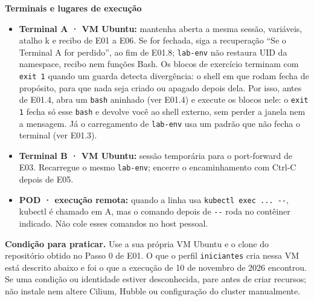 \documentclass[12pt,openany,oneside,a4paper,chapter=TITLE,english,brazil]{abntex2}
\providecommand{\tightlist}{\setlength{\itemsep}{0pt}\setlength{\parskip}{0pt}}
\begin{document}
\textbf{Terminais e lugares de execução}

\begin{itemize}
\tightlist
\item
  \textbf{Terminal A · VM Ubuntu:} mantenha aberta a mesma sessão, variáveis, atalho k e recibo de E01 a E06. Se for fechada, siga a recuperação ``Se o Terminal A for perdido'', ao fim de E01.8; \texttt{lab-{}\allowbreak{}env} não restaura UID da namespace, recibo nem funções Bash. Os blocos de exercício terminam com \texttt{exit 1} quando um guarda detecta divergência: o shell em que rodam fecha de propósito, para que nada seja criado ou apagado depois dela. Por isso, antes de E01.4, abra um \texttt{bash} aninhado (ver E01.4) e execute os blocos nele: o \texttt{exit 1} fecha só esse \texttt{bash} e devolve você ao shell externo, sem perder a janela nem a mensagem. Já o carregamento de \texttt{lab-{}\allowbreak{}env} usa um padrão que não fecha o terminal (ver E01.3).
\item
  \textbf{Terminal B · VM Ubuntu:} sessão temporária para o port-forward de E03. Recarregue o mesmo \texttt{lab-{}\allowbreak{}env}; encerre o encaminhamento com Ctrl-C depois de E05.
\item
  \textbf{POD · execução remota:} quando a linha usa \texttt{kubectl exec .\allowbreak{}.\allowbreak{}.\allowbreak{} -{}\allowbreak{}-{}\allowbreak{}}, kubectl é chamado em A, mas o comando depois de \texttt{-{}\allowbreak{}-{}\allowbreak{}} roda no contêiner indicado. Não cole esses comandos no host pessoal.
\end{itemize}

\begin{mdframed}[linewidth=0.6pt,innertopmargin=6pt,innerbottommargin=6pt]
\small
\textbf{Condição para praticar.} Use a sua própria VM Ubuntu e o clone
do repositório obtido no Passo 0 de E01. O que o perfil
\texttt{iniciantes} cria nessa VM está descrito abaixo e foi o que a
execução de 10 de novembro de 2026 encontrou. Se uma condição ou
identidade estiver desconhecida, pare antes de criar recursos; não
instale nem altere Cilium, Hubble ou configuração do cluster
manualmente.
\end{mdframed}
\end{document}
